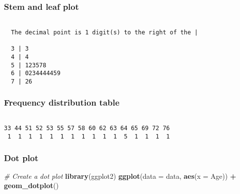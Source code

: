 \documentclass[]{book}
\newenvironment{Shaded}{\begin{snugshade}}{\end{snugshade}}
\newcommand{\KeywordTok}[1]{\textcolor[rgb]{0.13,0.29,0.53}{\textbf{#1}}}
\newcommand{\DataTypeTok}[1]{\textcolor[rgb]{0.13,0.29,0.53}{#1}}
\newcommand{\StringTok}[1]{\textcolor[rgb]{0.31,0.60,0.02}{#1}}
\newcommand{\CommentTok}[1]{\textcolor[rgb]{0.56,0.35,0.01}{\textit{#1}}}
\newcommand{\OperatorTok}[1]{\textcolor[rgb]{0.81,0.36,0.00}{\textbf{#1}}}
\newcommand{\NormalTok}[1]{#1}
\theoremstyle{definition}
\theoremstyle{definition}
\theoremstyle{definition}
\theoremstyle{remark}
\begin{document}
\subsubsection{Stem and leaf plot}\label{stem-and-leaf-plot}

\begin{Shaded}
\end{Shaded}

\begin{verbatim}

  The decimal point is 1 digit(s) to the right of the |

  3 | 3
  4 | 4
  5 | 123578
  6 | 0234444459
  7 | 26
\end{verbatim}

\subsubsection{Frequency distribution
table}\label{frequency-distribution-table}

\begin{Shaded}
\end{Shaded}

\begin{verbatim}

33 44 51 52 53 55 57 58 60 62 63 64 65 69 72 76 
 1  1  1  1  1  1  1  1  1  1  1  5  1  1  1  1 
\end{verbatim}

\subsubsection{Dot plot}\label{dot-plot}

\begin{Shaded}
\begin{Highlighting}[]
\CommentTok{# Create a dot plot}
\KeywordTok{library}\NormalTok{(ggplot2)}
\KeywordTok{ggplot}\NormalTok{(}\DataTypeTok{data =}\NormalTok{ data, }\KeywordTok{aes}\NormalTok{(}\DataTypeTok{x =}\NormalTok{ Age)) }\OperatorTok{+}
\StringTok{  }\KeywordTok{geom_dotplot}\NormalTok{()}
\end{Highlighting}
\end{Shaded}
\end{document}
